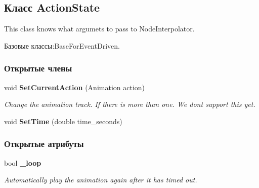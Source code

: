 \subsection{Класс Action\+State}
\label{class_win_form_animation2_d_1_1_action_state}


This class knows what argumets to pass to Node\+Interpolator.  




Базовые классы\+:Base\+For\+Event\+Driven.

\subsubsection*{Открытые члены}
\begin{DoxyCompactItemize}
\item 
void {\bf Set\+Current\+Action} (Animation action)\label{class_win_form_animation2_d_1_1_action_state_a19f814687397183cc3767bbb8d4e33ff}

\begin{DoxyCompactList}\small\item\em Change the animation track. If there is more than one. We don\textquotesingle{}t support this yet. \end{DoxyCompactList}\item 
void {\bf Set\+Time} (double time\+\_\+seconds)
\end{DoxyCompactItemize}
\subsubsection*{Открытые атрибуты}
\begin{DoxyCompactItemize}
\item 
bool {\bf \+\_\+loop}\label{class_win_form_animation2_d_1_1_action_state_a5305d65aecb7a29b3b0c6012c8804b51}

\begin{DoxyCompactList}\small\item\em Automatically play the animation again after it has timed out. \end{DoxyCompactList}\end{DoxyCompactItemize}
